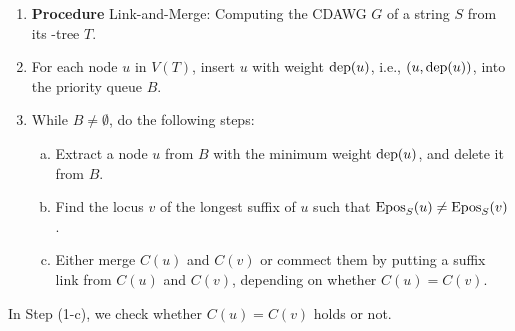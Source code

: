\begin{definition}\label{lem:maxrep:algo:highlevel}
\begin{enumerate}[(1)]
\item[] \hspace{-.75\leftmargini}\textbf{Procedure} Link-and-Merge: Computing the CDAWG $G$ of a string $S$ from its \LPTrm-tree $T$.
\item For each node $u$ in $V(T)$, insert $u$ with weight $\mathrm{dep}(u)$, i.e., $(u, \mathrm{dep}(u))$, into the priority queue $B$.
\item While $B \not= \emptyset$, do the following steps: 
\begin{enumerate}[(a)]
\item Extract a node $u$ from $B$ with the minimum weight $\mathrm{dep}(u)$, and delete it from $B$. 
\item Find the locus $v$ of the longest suffix  of $u$ such that $\mathrm{Epos}_{S}(u) \not= \mathrm{Epos}_{S}(v)$.
\item Either merge $C(u)$ and $C(v)$ or commect them by putting a suffix link from  $C(u)$ and $C(v)$, depending on whether $C(u) = C(v)$. 
\end{enumerate}
\end{enumerate}
\end{definition}

In Step (1-c), we check whether $C(u) = C(v)$ holds or not. 



